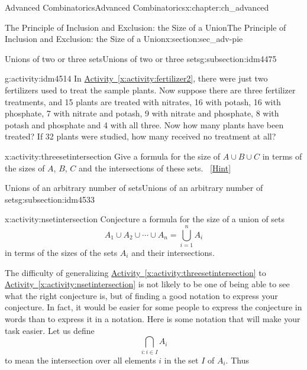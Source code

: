 \documentclass[oneside,10pt,]{book}
\numberwithin{equation}{chapter}
\begin{document}
\begin{chapterptx}{Advanced Combinatorics}{}{Advanced Combinatorics}{}{}{x:chapter:ch_advanced}
\begin{sectionptx}{The Principle of Inclusion and Exclusion: the Size of a Union}{}{The Principle of Inclusion and Exclusion: the Size of a Union}{}{}{x:section:sec_adv-pie}
\begin{subsectionptx}{Unions of two or three sets}{}{Unions of two or three sets}{}{}{g:subsection:idm4475}
\begin{activity}{}{g:activity:idm4514}%
In \hyperref[x:activity:fertilizer2]{Activity~\ref{x:activity:fertilizer2}}, there were just two fertilizers used to treat the sample plants. Now suppose there are three fertilizer treatments, and 15 plants are treated with nitrates, 16 with potash, 16 with phosphate, 7 with nitrate and potash, 9 with nitrate and phosphate, 8 with potash and phosphate and 4 with all three. Now how many plants have been treated? If 32 plants were studied, how many received no treatment at all?%
\end{activity}
\begin{activity}{}{x:activity:threesetintersection}%
Give a formula for the size of \(A\cup B\cup C\) in terms of the sizes of \(A\), \(B\), \(C\) and the intersections of these sets.%
\qquad~\hfill{\tiny\hyperlink{g:hint:idm4528-back}{[Hint]}}\end{activity}
\end{subsectionptx}
%
%
\typeout{************************************************}
\typeout{************************************************}
%
\begin{subsectionptx}{Unions of an arbitrary number of sets}{}{Unions of an arbitrary number of sets}{}{}{g:subsection:idm4533}
\begin{activity}{}{x:activity:nsetintersection}%
Conjecture a formula for the size of a union of sets%
\begin{equation*}
A_1\cup
A_2\cup \cdots\cup A_n = \bigcup_{i=1}^n A_i
\end{equation*}
in terms of the sizes of the sets \(A_i\) and their intersections.%
\end{activity}
The difficulty of generalizing \hyperref[x:activity:threesetintersection]{Activity~\ref{x:activity:threesetintersection}} to \hyperref[x:activity:nsetintersection]{Activity~\ref{x:activity:nsetintersection}} is not likely to be one of being able to see what the right conjecture is, but of finding a good notation to express your conjecture. In fact, it would be easier for some people to express the conjecture in words than to express it in a notation. Here is some notation that will make your task easier. Let us define%
\begin{equation*}
\bigcap_{i:i\in I}A_i
\end{equation*}
to mean the intersection over all elements \(i\) in the set \(I\) of \(A_i\). Thus%
\begin{equation}

\end{equation}
\end{subsectionptx}
\end{sectionptx}
\end{chapterptx}
\end{document}
